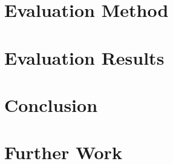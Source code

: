 \documentclass[a4paper]{report}
\begin{document}
\chapter{Evaluation Method}


\chapter{Evaluation Results}


\chapter{Conclusion}


\chapter{Further Work}

\clearpage


\renewcommand\bibname{References}


\end{document}

